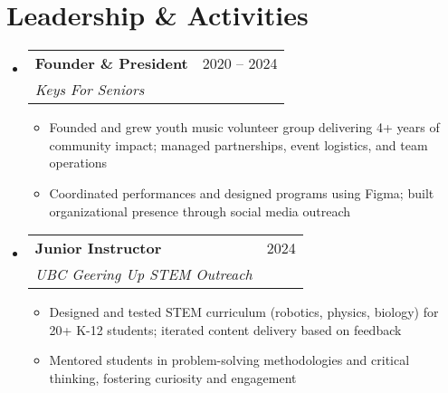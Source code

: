 \documentclass[letterpaper,11pt]{article}
\makeatletter
\newcommand{\resumeItem}[1]{
  \item\small{
    {#1 \vspace{-2pt}}
  }
}
\newcommand{\resumeSubheading}[4]{
  \vspace{-2pt}\item
    \begin{tabular*}{0.97\textwidth}[t]{l@{\extracolsep{\fill}}r}
      \textbf{#1} & #2 \\
      \textit{\small#3} & \textit{\small #4} \\
    \end{tabular*}\vspace{-9pt}
}
\newcommand{\resumeSubHeadingListStart}{\begin{itemize}[leftmargin=0.15in, label={}]}
\newcommand{\resumeSubHeadingListEnd}{\end{itemize}}
\newcommand{\resumeItemListStart}{\begin{itemize}}
\newcommand{\resumeItemListEnd}{\end{itemize}\vspace{-7pt}}
\makeatother
\begin{document}
\section{Leadership \& Activities}
  \resumeSubHeadingListStart
    \resumeSubheading
      {Founder \& President}{2020 -- 2024}
      {Keys For Seniors}{}
      \resumeItemListStart
        \resumeItem{Founded and grew youth music volunteer group delivering 4+ years of community impact; managed partnerships, event logistics, and team operations}
        \resumeItem{Coordinated performances and designed programs using Figma; built organizational presence through social media outreach}
      \resumeItemListEnd

    \resumeSubheading
      {Junior Instructor}{2024}
      {UBC Geering Up STEM Outreach}{}
      \resumeItemListStart
        \resumeItem{Designed and tested STEM curriculum (robotics, physics, biology) for 20+ K-12 students; iterated content delivery based on feedback}
        \resumeItem{Mentored students in problem-solving methodologies and critical thinking, fostering curiosity and engagement}
      \resumeItemListEnd
  \resumeSubHeadingListEnd

\end{document}
